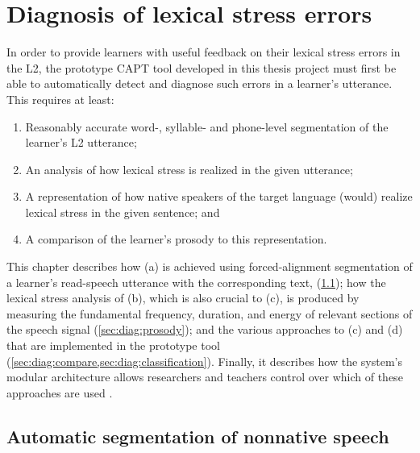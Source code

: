 %
%
\chapter{Diagnosis of lexical stress errors}
\label{chap:diagnosis}


In order to provide learners with useful feedback on their lexical stress errors in the L2, 
the prototype CAPT tool developed in this thesis project 
must first be able to automatically detect and diagnose such errors in a learner's utterance. This requires at least:
\begin{enumerate}[label=(\alph*)]
\item Reasonably accurate word-, syllable- and phone-level segmentation of the learner's L2 utterance; 
\item %
An analysis of how lexical stress is realized in the
given
utterance;
\item A representation of how native speakers of the target language (would) realize lexical stress in the given sentence; and
\item %
A comparison of the learner's prosody to this representation. 
\end{enumerate}

This chapter describes 
%
how (a) is achieved using
 forced-alignment segmentation of a learner's read-speech utterance with the corresponding text, 
 (\cref{sec:diag:segmentation}); 
 how the lexical stress analysis of (b), which is also crucial to (c), is produced by measuring the fundamental frequency, duration, and energy of relevant sections of the speech signal (\cref{sec:diag:prosody}); 
 and 
 the various approaches to (c) and (d) that are implemented in the prototype tool (\cref{sec:diag:compare,sec:diag:classification}).
 Finally, it describes how the system's modular architecture allows researchers and teachers control over which of these approaches are used .



\section{Automatic segmentation of nonnative speech}
\label{sec:diag:segmentation}

